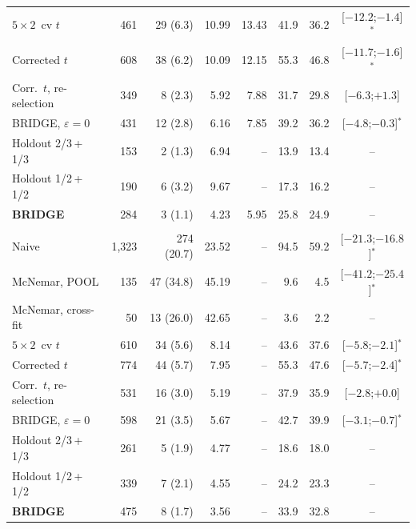 \begin{table}[!t]
\begin{minipage}[t]{0.494\textwidth}
\begin{tabular}[t]{@{}lr@{\hspace{5pt}}rrrrrc@{}}
$5\times2$~cv $t$ & 461 & 29 (6.3) & 10.99 & 13.43 & 41.9 & 36.2 & [$-12.2$;$-1.4$]$^{*}$ \\
Corrected $t$ & 608 & 38 (6.2) & 10.09 & 12.15 & 55.3 & 46.8 & [$-11.7$;$-1.6$]$^{*}$ \\
Corr.\ $t$, re-selection & 349 & 8 (2.3) & 5.92 & 7.88 & 31.7 & 29.8 & [$-6.3$;$+1.3$] \\
BRIDGE, $\varepsilon=0$ & 431 & 12 (2.8) & 6.16 & 7.85 & 39.2 & 36.2 & [$-4.8$;$-0.3$]$^{*}$ \\
Holdout 2/3\,+\,1/3 & 153 & 2 (1.3) & 6.94 & -- & 13.9 & 13.4 & -- \\
Holdout 1/2\,+\,1/2 & 190 & 6 (3.2) & 9.67 & -- & 17.3 & 16.2 & -- \\
\textbf{BRIDGE} & 284 & 3 (1.1) & 4.23 & 5.95 & 25.8 & 24.9 & -- \\
\addlinespace
\multicolumn{8}{@{}l}{\textit{(B) synthetic population $\mathcal{Q}$, 1,400 tasks}} \\
Naive & 1,323 & 274 (20.7) & 23.52 & -- & 94.5 & 59.2 & [$-21.3$;$-16.8$]$^{*}$ \\
McNemar, POOL & 135 & 47 (34.8) & 45.19 & -- & 9.6 & 4.5 & [$-41.2$;$-25.4$]$^{*}$ \\
McNemar, cross-fit & 50 & 13 (26.0) & 42.65 & -- & 3.6 & 2.2 & -- \\
$5\times2$~cv $t$ & 610 & 34 (5.6) & 8.14 & -- & 43.6 & 37.6 & [$-5.8$;$-2.1$]$^{*}$ \\
Corrected $t$ & 774 & 44 (5.7) & 7.95 & -- & 55.3 & 47.6 & [$-5.7$;$-2.4$]$^{*}$ \\
Corr.\ $t$, re-selection & 531 & 16 (3.0) & 5.19 & -- & 37.9 & 35.9 & [$-2.8$;$+0.0$] \\
BRIDGE, $\varepsilon=0$ & 598 & 21 (3.5) & 5.67 & -- & 42.7 & 39.9 & [$-3.1$;$-0.7$]$^{*}$ \\
Holdout 2/3\,+\,1/3 & 261 & 5 (1.9) & 4.77 & -- & 18.6 & 18.0 & -- \\
Holdout 1/2\,+\,1/2 & 339 & 7 (2.1) & 4.55 & -- & 24.2 & 23.3 & -- \\
\textbf{BRIDGE} & 475 & 8 (1.7) & 3.56 & -- & 33.9 & 32.8 & -- \\
\bottomrule
\end{tabular}
\end{minipage}\hfill
\begin{minipage}[t]{0.494\textwidth}\centering
\begin{tabular}[t]{@{}lr@{\hspace{5pt}}rrrrrc@{}}
\toprule

\end{tabular}
\end{minipage}
\end{table}
